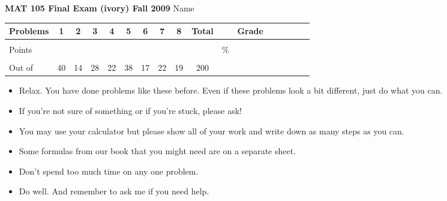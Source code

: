 \documentclass[12pt]{article}
\begin{document}
{\bf MAT 105 Final Exam (ivory) Fall 2009} \hspace{.4in} {\large Name} \hrulefill

\hspace{.2in}

\begin{center}

\begin{tabular}
{|l|c|c|c|c|c|c|c|c|c|c|c|c|c|c|c|c|} \hline

 Problems & \hspace{5 pt} 1 \hspace{5 pt}  & \hspace{5 pt} 2 \hspace{5 pt} & \hspace{5 pt} 3 \hspace{5 pt} & \hspace{5 pt} 4 \hspace{5 pt}& \hspace{5 pt} 5 \hspace{5 pt} & \hspace{5 pt} 6 \hspace{5 pt} & \hspace{5 pt} 7 \hspace{5 pt}   & \hspace{5 pt} 8 \hspace{5 pt} &  \hspace{5 pt} Total  \hspace{5 pt} & &  \hspace{5 pt} Grade \hspace{5 pt}  \\ \hline
&&&&&&&&&&&\\  
Points &&&&&&&&&&   \hspace{.6in}\% &  \\ 
&&&&&&&&&&& \\  \hline
Out of & 40  & 14 & 28 & 22 & 38 & 17 & 22 & 19 &200 & & \\ \hline

\end {tabular}
 
\end{center}

\hspace{.2in}

\begin{itemize}
\item Relax.  You have done problems like these before. Even if these problems look a bit different, just do what you can. 
\item  If you're not sure of something or if you're stuck, please ask! 
\item You may use your calculator but please show all of your work and write down as many steps as you can.  
\item Some formulas from our book that you might need are on a separate sheet.
\item Don't spend too much time on any one problem.
\item  Do well.  And remember to ask me if you need help.
\end{itemize}
\end{document}
